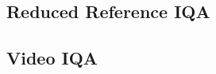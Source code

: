 \documentclass[12pt]{article}
\begin{document}
\subsection{Reduced Reference IQA} 
\label{sub:reduced_reference_iqa}


\subsection{Video IQA} 
\label{sub:video_iqa}




\end{document}
